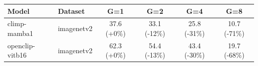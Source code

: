 \begin{tabular}{llcccc}
\toprule
Model & Dataset & G=1 & G=2 & G=4 & G=8 \\
\midrule
climp-mamba1 & imagenetv2 & 37.6 (+0\%) & 33.1 (-12\%) & 25.8 (-31\%) & 10.7 (-71\%) \\
openclip-vitb16 & imagenetv2 & 62.3 (+0\%) & 54.4 (-13\%) & 43.4 (-30\%) & 19.7 (-68\%) \\
\bottomrule
\end{tabular}
